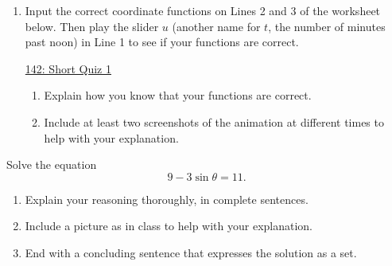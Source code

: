 \documentclass{ximera}
\begin{document}
\begin{question}
\begin{enumerate}
\item Input the correct coordinate functions on Lines 2 and 3 of the worksheet below. Then play the slider $u$ (another name for $t$, the number of minutes past noon) in Line 1 to see if your functions are correct. 

\begin{onlineOnly}
    \begin{center}
\end{center}
\end{onlineOnly}

\href{https://www.desmos.com/calculator/lkrunhfgxi}{142: Short Quiz 1}

\begin{enumerate}
\item Explain how you know that your functions are correct.

\item Include at least two screenshots of the animation at different times to help with your explanation.
\end{enumerate}
\end{enumerate}

\end{question}

\begin{question}  \label{Qdhftghhghnbnnh}
Solve the equation
\[
        9 - 3 \sin \theta = 11 .
\]

\begin{enumerate}
\item Explain your reasoning thoroughly, in complete sentences.

\item Include a picture as in class to help with your explanation.

\item End with a concluding sentence that expresses the solution as a set.
\end{enumerate}

\end{question}
\end{document}
